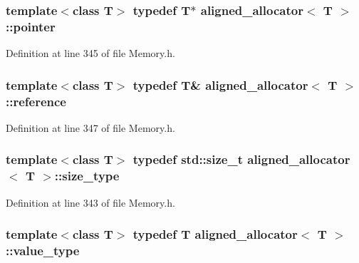 \hypertarget{classaligned__allocator_a6594075542435bfbdd8e96e197b12ab7}{
\subsubsection[{pointer}]{\setlength{\rightskip}{0pt plus 5cm}template$<$class T$>$ typedef T$\ast$ {\bf aligned\-\_\-allocator}$<$ T $>$\-::{\bf pointer}}}\label{classaligned__allocator_a6594075542435bfbdd8e96e197b12ab7}


Definition at line 345 of file Memory.\-h.

\hypertarget{classaligned__allocator_a631a9ed77fe18361d10e8a50ab6d6230}{
\subsubsection[{reference}]{\setlength{\rightskip}{0pt plus 5cm}template$<$class T$>$ typedef T\& {\bf aligned\-\_\-allocator}$<$ T $>$\-::{\bf reference}}}\label{classaligned__allocator_a631a9ed77fe18361d10e8a50ab6d6230}


Definition at line 347 of file Memory.\-h.

\hypertarget{classaligned__allocator_a8546aec5c19297c6a68abc86ee5ef728}{
\subsubsection[{size\-\_\-type}]{\setlength{\rightskip}{0pt plus 5cm}template$<$class T$>$ typedef std\-::size\-\_\-t {\bf aligned\-\_\-allocator}$<$ T $>$\-::{\bf size\-\_\-type}}}\label{classaligned__allocator_a8546aec5c19297c6a68abc86ee5ef728}


Definition at line 343 of file Memory.\-h.

\hypertarget{classaligned__allocator_ad54ae81077219c954d5f2319052af2b2}{
\subsubsection[{value\-\_\-type}]{\setlength{\rightskip}{0pt plus 5cm}template$<$class T$>$ typedef T {\bf aligned\-\_\-allocator}$<$ T $>$\-::{\bf value\-\_\-type}}}\label{classaligned__allocator_ad54ae81077219c954d5f2319052af2b2}


